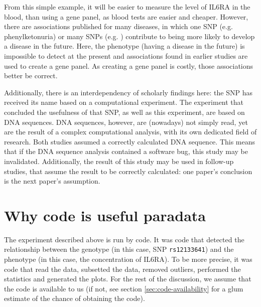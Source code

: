 From this simple example, it will be easier
to measure the level of IL6RA in the blood, than using a gene panel,
as blood tests are easier and cheaper.
However, there are associations published for many diseases,
in which one SNP (e.g. phenylketonuria) or many SNPs (e.g. \cite{bruce2009metabolic}) 
contribute to being more likely to develop a disease in the future. 
Here, the phenotype (having a disease in the future) 
is impossible to detect at the present
and associations found in earlier studies are used to create a gene panel.
As creating a gene panel is costly, those associations better be correct.

Additionally, there is an interdependency of scholarly findings here:
the SNP has received its name based on a computational experiment.
The experiment that concluded the usefulness of that SNP, 
as well as this experiment, are based on DNA sequences.
DNA sequences, however, are (nowadays) not simply read, 
yet are the result of a complex computational analysis,
with its own dedicated field of research.
Both studies assumed a correctly calculated DNA sequence.
This means that if the DNA sequence analysis contained a software bug, 
this study may be invalidated. 
Additionally, the result of this study may be used in follow-up studies,
that assume the result to be correctly calculated: one paper's conclusion
is the next paper's assumption.

\section{Why code is useful paradata}


The experiment described above is run by code. 
It was code that detected the relationship between the genotype
(in this case, SNP \verb|rs12133641|) 
and the phenotype (in this case, the concentration of IL6RA).
To be more precise, it was code that read the data,
subsetted the data, removed outliers, 
performed the statistics and generated the plots.
For the rest of the discussion, we assume that the
code is available to us (if not, see section \ref{sec:code-availability} 
for a glum estimate of the chance of obtaining the code).

